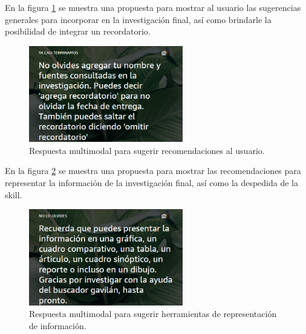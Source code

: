 En la figura \ref{fig:56} se muestra una propuesta para mostrar al usuario las sugerencias generales para incorporar en la investigación final, así como brindarle la posibilidad de integrar un recordatorio.

\begin{figure}[H]
  \centering
  \includegraphics[width=0.60\textwidth]{Cap5/Figuras/Multimodal5.png}
  \caption{Respuesta multimodal para sugerir recomendaciones al usuario.}
  \label{fig:56}
\end{figure}

En la figura \ref{fig:57} se muestra una propuesta para mostrar las recomendaciones para representar la información de la investigación final, así como la despedida de la skill.

\begin{figure}[H]
  \centering
  \includegraphics[width=0.60\textwidth]{Cap5/Figuras/Multimodal6.png}
  \caption{Respuesta multimodal para sugerir herramientas de representación de información.}
  \label{fig:57}
\end{figure}
